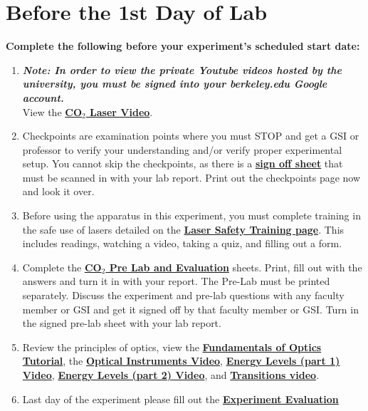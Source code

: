 \documentclass{../lab}
\begin{document}
\section{Before the 1st Day of Lab}

\textbf{Complete the following before your experiment's scheduled start date:}

\begin{enumerate}
    \item \emph{\textbf{Note: In order to view the private Youtube videos hosted by the university, you must be signed into your berkeley.edu Google account.}} \\
    View the \href{http://youtu.be/-cLSnuXGC\_U}{\textbf{CO$_2$ Laser Video}}.

    \item Checkpoints are examination points where you must STOP and get a GSI or professor to verify your understanding and/or verify proper experimental setup. You cannot skip the checkpoints, as there is a \href{http://experimentationlab.berkeley.edu/node/137}{\textbf{sign off sheet}} that must be scanned in with your lab report. Print out the checkpoints page now and look it over.

    \item Before using the apparatus in this experiment, you must complete training in the safe use of lasers detailed on the \href{http://experimentationlab.berkeley.edu/lasersafety}{\textbf{\textbf{Laser Safety Training page}}}. This includes readings, watching a video, taking a quiz, and filling out a form.

    \item Complete the \href{http://experimentationlab.berkeley.edu/CO2prelab}{\textbf{\textbf{CO$_2$ Pre Lab and Evaluation}}} sheets. Print,  fill out with the answers and turn it in with your report. The Pre-Lab must be printed separately. Discuss the experiment and pre-lab questions with any faculty member or GSI and get it signed off by that faculty member or GSI. Turn in the signed pre-lab sheet with your lab report.

    \item Review the principles of optics, view the \href{http://experimentationlab.berkeley.edu/sites/default/files/QIE/fundamental-Optics.pdf}{\textbf{Fundamentals of Optics Tutorial}}, the \href{http://youtu.be/zUGBt5vc5FA}{\textbf{Optical Instruments Video}}, \href{http://youtu.be/wyBOVjU5bBQ}{\textbf{Energy Levels (part 1) Video}}, \href{http://youtu.be/Eypw0DmVBxk}{\textbf{Energy Levels (part 2) Video}}, and \href{http://youtu.be/xOMgdVP3AfE}{\textbf{Transitions video}}.

    \item Last day of the experiment please fill out the \href{\ExperimentEvaluation}{\textbf{Experiment Evaluation}}

\end{enumerate}
\end{document}
